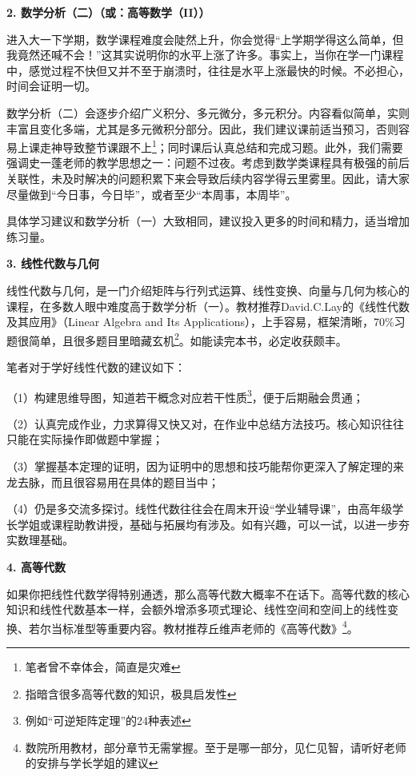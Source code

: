\documentclass[11pt,oneside]{book}
\begin{document}
\textbf{2. 数学分析（二）（或：高等数学（II））}

进入大一下学期，数学课程难度会陡然上升，你会觉得“上学期学得这么简单，但我竟然还喊不会！”这其实说明你的水平上涨了许多。事实上，当你在学一门课程中，感觉过程不快但又并不至于崩溃时，往往是水平上涨最快的时候。不必担心，时间会证明一切。

数学分析（二）会逐步介绍广义积分、多元微分，多元积分。内容看似简单，实则丰富且变化多端，尤其是多元微积分部分。因此，我们建议课前适当预习，否则容易上课走神导致整节课跟不上\footnote{笔者曾不幸体会，简直是灾难}；同时课后认真总结和完成习题。此外，我们需要强调史一蓬老师的教学思想之一：问题不过夜。考虑到数学类课程具有极强的前后关联性，未及时解决的问题积累下来会导致后续内容学得云里雾里。因此，请大家尽量做到“今日事，今日毕”，或者至少“本周事，本周毕”。

具体学习建议和数学分析（一）大致相同，建议投入更多的时间和精力，适当增加练习量。

\vspace{10pt}

\textbf{3. 线性代数与几何} 

线性代数与几何，是一门介绍矩阵与行列式运算、线性变换、向量与几何为核心的课程，在多数人眼中难度高于数学分析（一）。教材推荐David.C.Lay的《线性代数及其应用》（Linear Algebra and Its Applications），上手容易，框架清晰，70\%习题很简单，且很多题目里暗藏玄机\footnote{指暗含很多高等代数的知识，极具启发性}。如能读完本书，必定收获颇丰。

\vspace{10pt}

笔者对于学好线性代数的建议如下：

（1）构建思维导图，知道若干概念对应若干性质\footnote{例如“可逆矩阵定理”的24种表述}，便于后期融会贯通；

（2）认真完成作业，力求算得又快又对，在作业中总结方法技巧。核心知识往往只能在实际操作即做题中掌握；

（3）掌握基本定理的证明，因为证明中的思想和技巧能帮你更深入了解定理的来龙去脉，而且很容易用在具体的题目当中；

（4）仍是多交流多探讨。线性代数往往会在周末开设“学业辅导课”，由高年级学长学姐或课程助教讲授，基础与拓展均有涉及。如有兴趣，可以一试，以进一步夯实数理基础。

\vspace{10pt}

\textbf{4. 高等代数}

如果你把线性代数学得特别通透，那么高等代数大概率不在话下。高等代数的核心知识和线性代数基本一样，会额外增添多项式理论、线性空间和空间上的线性变换、若尔当标准型等重要内容。教材推荐丘维声老师的《高等代数》\footnote{数院所用教材，部分章节无需掌握。至于是哪一部分，见仁见智，请听好老师的安排与学长学姐的建议}。
\end{document}
